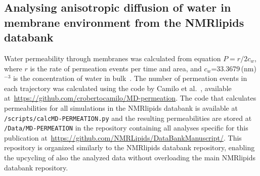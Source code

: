 \documentclass[fleqn,10pt]{wlscirep}
\begin{document}
\subsection{Analysing anisotropic diffusion of water in membrane environment from the NMRlipids databank}



Water permeability through membranes was calculated from equation $P=r/2c_w$, where $r$ is the rate of permeation events per time and area, and $c_w$=33.3679\,(nm)$^{-3}$ is the concentration of water in bulk~\cite{venable19}. The number of permeation events in each trajectory was calculated using the code by Camilo et al.~\cite{camilo2022}, available at~\url{https://github.com/crobertocamilo/MD-permeation}. 
The code that calculates permeabilities for all simulations in the NMRlipids databank is available at \texttt{/scripts/calcMD-PERMEATION.py} and the resulting permeabilities are stored at \texttt{/Data/MD-PERMEATION} in the repository containing all analyses specific for this publication at~\url{https://github.com/NMRLipids/DataBankManuscript/}. 
This repository is organized similarly to the NMRlipids databank repository, enabling the upcycling of also the analyzed data without overloading the main NMRlipids databank repository. 
\end{document}
